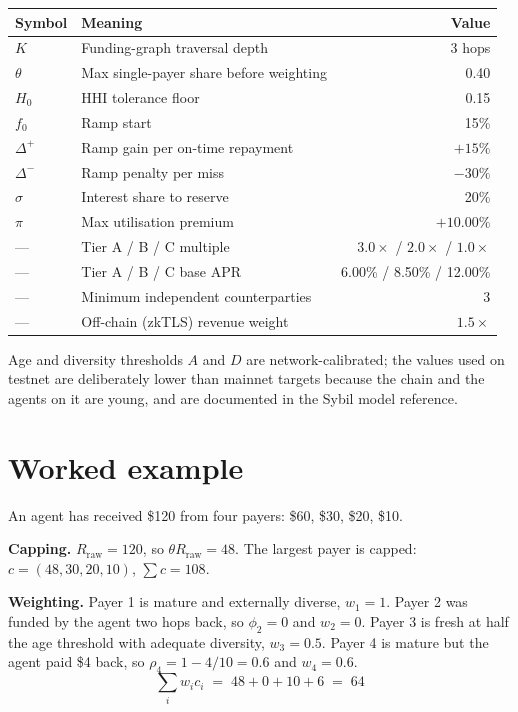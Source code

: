 \documentclass[11pt,a4paper]{article}
\begin{document}
\begin{center}
\begin{tabular}{@{}llr@{}}
\toprule
\textbf{Symbol} & \textbf{Meaning} & \textbf{Value} \\
\midrule
$K$          & Funding-graph traversal depth        & 3 hops \\
$\theta$     & Max single-payer share before weighting & 0.40 \\
$H_0$        & HHI tolerance floor                  & 0.15 \\
$f_0$        & Ramp start                           & 15\% \\
$\Delta^{+}$ & Ramp gain per on-time repayment      & $+15\%$ \\
$\Delta^{-}$ & Ramp penalty per miss                & $-30\%$ \\
$\sigma$     & Interest share to reserve            & 20\% \\
$\pi$        & Max utilisation premium              & $+10.00\%$ \\
---          & Tier A / B / C multiple              & $3.0\times$ / $2.0\times$ / $1.0\times$ \\
---          & Tier A / B / C base APR              & 6.00\% / 8.50\% / 12.00\% \\
---          & Minimum independent counterparties   & 3 \\
---          & Off-chain (zkTLS) revenue weight     & $1.5\times$ \\
\bottomrule
\end{tabular}
\end{center}

Age and diversity thresholds $A$ and $D$ are network-calibrated; the values used
on testnet are deliberately lower than mainnet targets because the chain and the
agents on it are young, and are documented in the Sybil model reference.

\section{Worked example}

An agent has received \$120 from four payers: \$60, \$30, \$20, \$10.

\textbf{Capping.} $R_{\mathrm{raw}} = 120$, so $\theta R_{\mathrm{raw}} = 48$.
The largest payer is capped: $c = (48, 30, 20, 10)$, $\sum c = 108$.

\textbf{Weighting.} Payer 1 is mature and externally diverse, $w_1 = 1$. Payer 2
was funded by the agent two hops back, so $\phi_2 = 0$ and $w_2 = 0$. Payer 3 is
fresh at half the age threshold with adequate diversity, $w_3 = 0.5$. Payer 4 is
mature but the agent paid \$4 back, so $\rho_4 = 1 - 4/10 = 0.6$ and $w_4 = 0.6$.
\[
\sum_i w_i c_i \;=\; 48 + 0 + 10 + 6 \;=\; 64
\]
\end{document}
